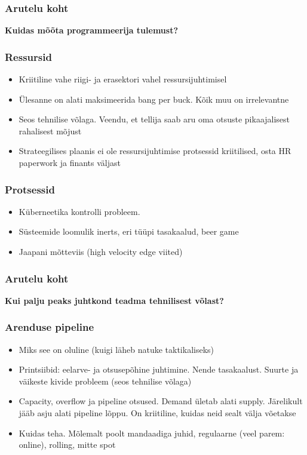 \begin{frame}[fragile]
  \frametitle{Arutelu koht}
		\begin{center}
			\textbf{Kuidas mõõta programmeerija tulemust?}
		\end{center}
\end{frame}

\begin{frame}[fragile]
  \frametitle{Ressursid}
	\begin{itemize}
		\item Kriitiline vahe riigi- ja erasektori vahel ressursijuhtimisel
		\item Ülesanne on alati maksimeerida bang per buck. Kõik muu on irrelevantne
		\item Seos tehnilise võlaga. Veendu, et tellija saab aru oma otsuste pikaajalisest rahalisest mõjust
		\item Strateegilises plaanis ei ole ressursijuhtimise protsessid kriitilised, osta HR paperwork ja finants väljast
	\end{itemize}
\end{frame}

\begin{frame}[fragile]
  \frametitle{Protsessid}
	\begin{itemize}
		\item Küberneetika kontrolli probleem. 
		\item Süsteemide loomulik inerts, eri tüüpi tasakaalud, beer game
		\item Jaapani mõtteviis (high velocity edge viited)
	\end{itemize}
\end{frame}


\begin{frame}[fragile]
  \frametitle{Arutelu koht}
		\begin{center}
			\textbf{Kui palju peaks juhtkond teadma tehnilisest võlast?}
		\end{center}
\end{frame}

\begin{frame}[fragile]
  \frametitle{Arenduse pipeline}
	\begin{itemize}
		\item Miks see on oluline (kuigi läheb natuke taktikaliseks)
		\item Printsiibid: eelarve- ja otsusepõhine juhtimine. Nende tasakaalust. Suurte ja väikeste kivide probleem (seos tehnilise võlaga)
		\item Capacity, overflow ja pipeline otsused. Demand ületab alati supply. Järelikult jääb asju alati pipeline lõppu. On kriitiline, kuidas neid sealt välja võetakse
		\item Kuidas teha. Mõlemalt poolt mandaadiga juhid, regulaarne (veel parem: online), rolling, mitte spot
	\end{itemize}
\end{frame}

